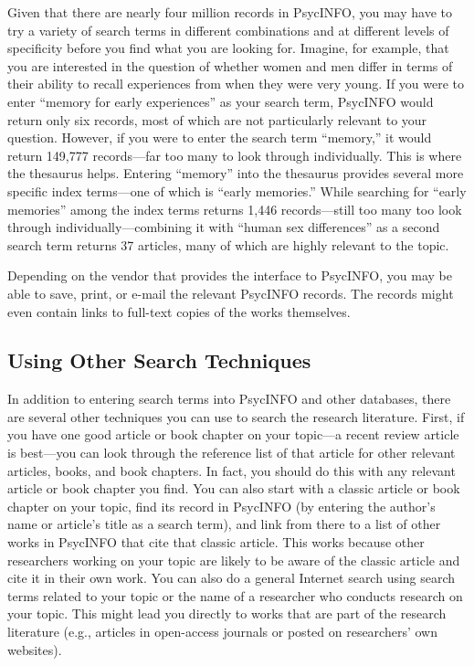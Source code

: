 \documentclass[]{book}
\theoremstyle{definition}
\theoremstyle{definition}
\theoremstyle{remark}
\begin{document}
Given that there are nearly four million records in PsycINFO, you may
have to try a variety of search terms in different combinations and at
different levels of specificity before you find what you are looking
for. Imagine, for example, that you are interested in the question of
whether women and men differ in terms of their ability to recall
experiences from when they were very young. If you were to enter
``memory for early experiences'' as your search term, PsycINFO would
return only six records, most of which are not particularly relevant to
your question. However, if you were to enter the search term ``memory,''
it would return 149,777 records---far too many to look through
individually. This is where the thesaurus helps. Entering ``memory''
into the thesaurus provides several more specific index terms---one of
which is ``early memories.'' While searching for ``early memories''
among the index terms returns 1,446 records---still too many too look
through individually---combining it with ``human sex differences'' as a
second search term returns 37 articles, many of which are highly
relevant to the topic.

Depending on the vendor that provides the interface to PsycINFO, you may
be able to save, print, or e-mail the relevant PsycINFO records. The
records might even contain links to full-text copies of the works
themselves.

\subsection{Using Other Search
Techniques}\label{using-other-search-techniques}

In addition to entering search terms into PsycINFO and other databases,
there are several other techniques you can use to search the research
literature. First, if you have one good article or book chapter on your
topic---a recent review article is best---you can look through the
reference list of that article for other relevant articles, books, and
book chapters. In fact, you should do this with any relevant article or
book chapter you find. You can also start with a classic article or book
chapter on your topic, find its record in PsycINFO (by entering the
author's name or article's title as a search term), and link from there
to a list of other works in PsycINFO that cite that classic article.
This works because other researchers working on your topic are likely to
be aware of the classic article and cite it in their own work. You can
also do a general Internet search using search terms related to your
topic or the name of a researcher who conducts research on your topic.
This might lead you directly to works that are part of the research
literature (e.g., articles in open-access journals or posted on
researchers' own websites).
\end{document}

